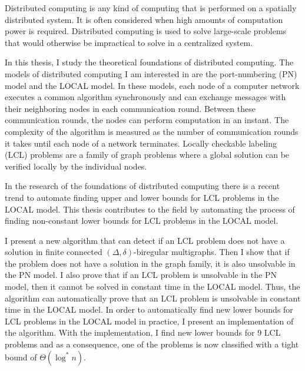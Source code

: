\begin{abstractpage}[english]
Distributed computing is any kind of computing that is performed on a spatially distributed system.
It is often considered when high amounts of computation power is required.
Distributed computing is used to solve large-scale problems that would otherwise be impractical to solve in a centralized system.

In this thesis, I study the theoretical foundations of distributed computing.
The models of distributed computing I am interested in are the port-numbering (PN) model and the LOCAL model.
In these models, each node of a computer network executes a common algorithm synchronously and can exchange messages with their neighboring nodes in each communication round.
Between these communication rounds, the nodes can perform computation in an instant.
The complexity of the algorithm is measured as the number of communication rounds it takes until each node of a network terminates.
Locally checkable labeling (LCL) problems are a family of graph problems where a global solution can be verified locally by the individual nodes.

In the research of the foundations of distributed computing there is a recent trend to automate finding upper and lower bounds for LCL problems in the LOCAL model.
This thesis contributes to the field by automating the process of finding non-constant lower bounds for LCL problems in the LOCAL model.

I present a new algorithm that can detect if an LCL problem does not have a solution in finite connected $(\Delta, \delta)$-biregular multigraphs.
Then I show that if the problem does not have a solution in the graph family, it is also unsolvable in the PN model.
I also prove that if an LCL problem is unsolvable in the PN model, then it cannot be solved in constant time in the LOCAL model.
Thus, the algorithm can automatically prove that an LCL problem is unsolvable in constant time in the LOCAL model.
In order to automatically find new lower bounds for LCL problems in the LOCAL model in practice, I present an implementation of the algorithm.
With the implementation, I find new lower bounds for 9 LCL problems and as a consequence, one of the problems is now classified with a tight bound of $\Theta(\log^* n)$.

\end{abstractpage}
